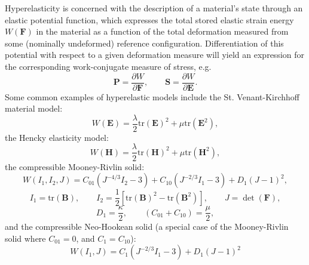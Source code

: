 Hyperelasticity is concerned with the description of a material's state through an elastic potential function, which expresses the total stored elastic strain energy $W (\mathbf{F})$ in the material as a function of the total deformation measured from some (nominally undeformed) reference configuration. Differentiation of this potential with respect to a given deformation measure will yield an expression for the corresponding work-conjugate measure of stress, e.g.
\begin{equation}
  \mathbf{P} = \frac{\partial W}{\partial \mathbf{F}}, \qquad \mathbf{S} = \frac{\partial W}{\partial \mathbf{E}}.
\end{equation}
Some common examples of hyperelastic models include the St. Venant-Kirchhoff material model:
\begin{equation}
  W (\mathbf{E}) = \frac{\lambda}{2} \text{tr} (\mathbf{E})^2 + \mu \text{tr} (\mathbf{E}^2),
\end{equation}
the Hencky elasticity model:
\begin{equation}
  W (\mathbf{H}) = \frac{\lambda}{2} \text{tr} (\mathbf{H})^2 + \mu \text{tr} (\mathbf{H}^2),
\end{equation}
the compressible Mooney-Rivlin solid:
\begin{equation}
  W (I_1, I_2, J) = C_{01} (J^{-4/3} I_2 - 3) + C_{10} (J^{-2/3} I_1 - 3) + D_1 (J - 1)^2,
\end{equation}
\begin{equation}
  I_1 = \text{tr} (\mathbf{B}), \qquad I_2 = \frac{1}{2} \left[ \text{tr} (\mathbf{B})^2 - \text{tr} (\mathbf{B}^2) \right], \qquad J = \det (\mathbf{F}),
\end{equation}
\begin{equation}
  D_1 = \frac{\kappa}{2}, \qquad (C_{01} + C_{10}) = \frac{\mu}{2},
\end{equation}
and the compressible Neo-Hookean solid (a special case of the Mooney-Rivlin solid where $C_{01} = 0$, and $C_1 = C_{10}$):
\begin{equation}
  W (I_1, J) = C_1 (J^{-2/3} I_1 - 3) + D_1 (J - 1)^2
\end{equation}

